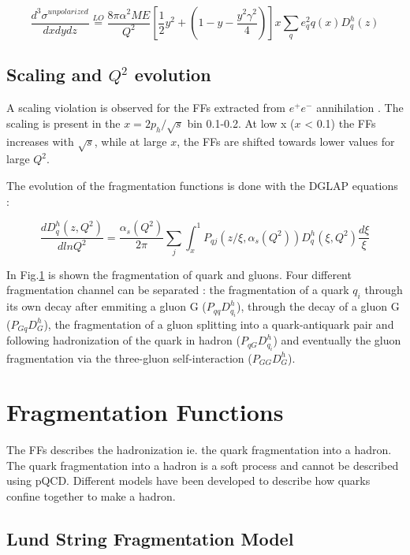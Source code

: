\begin{equation}
  \frac{d^3 \sigma^{unpolarized}}{dxdydz} \stackrel{LO}{=} \frac{8\pi\alpha^2ME}{Q^2}[\frac{1}{2}y^2+(1-y-\frac{y^2 \gamma^2}{4})]x\sum\limits_qe^2_qq(x)D_q^h(z)
\end{equation}

\subsection*{Scaling and $Q^2$ evolution}

A scaling violation is observed for the FFs extracted from $e^+e^-$ annihilation \cite{}. The scaling is present in the $x = 2p_h/\sqrt{s}$
bin 0.1-0.2. At low x ($x$ < 0.1) the FFs increases with $\sqrt{s}$, while at large $x$, the FFs are shifted towards lower values for large
$Q^2$.


The evolution of the fragmentation functions is done with the DGLAP equations \cite{} :

\begin{equation}
  \frac{dD_q^h(z,Q^2)}{dlnQ^2} = \frac{\alpha_s(Q^2)}{2\pi}\sum\limits_j\int_{x}^{1}P_{qj}(z/\xi,\alpha_s(Q^2))D_q^h(\xi,Q^2)\frac{d\xi}{\xi}
\end{equation}

In Fig.\ref{} is shown the fragmentation of quark and gluons. Four different fragmentation channel can be separated : the fragmentation of a quark
$q_i$ through its own decay after emmiting a gluon G ($P_{qq}D_{q_i}^h$), through the decay of a gluon G ($P_{Gq}D_{G}^h$), the fragmentation of a
gluon splitting into a quark-antiquark pair and following hadronization of the quark in hadron ($P_{qG}D_{q_i}^h$) and eventually the gluon
fragmentation via the three-gluon self-interaction ($P_{GG}D_{G}^h$).


\section{Fragmentation Functions}

The FFs describes the hadronization ie. the quark fragmentation into a hadron. The quark fragmentation into a hadron is a soft process and cannot
be described using pQCD. Different models have been developed to describe how quarks confine together to make a hadron.

\subsection*{Lund String Fragmentation Model}

